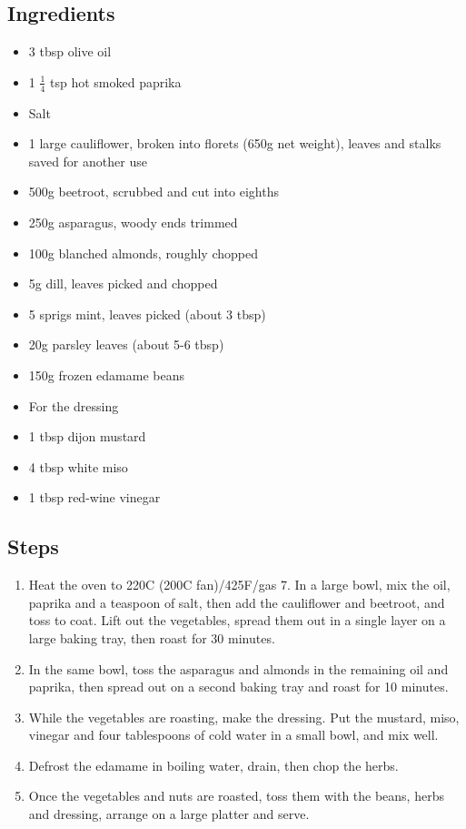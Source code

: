 \documentclass{book}
\begin{document}
\subsection*{Ingredients}
\begin{itemize}
\item 3 tbsp olive oil
\item 1 $\frac{1}{4}$ tsp hot smoked paprika
\item Salt
\item 1 large cauliflower, broken into florets (650g net weight), leaves and stalks saved for another use
\item 500g beetroot, scrubbed and cut into eighths
\item 250g asparagus, woody ends trimmed
\item 100g blanched almonds, roughly chopped
\item 5g dill, leaves picked and chopped
\item 5 sprigs mint, leaves picked (about 3 tbsp)
\item 20g parsley leaves (about 5-6 tbsp)
\item 150g frozen edamame beans
\end{itemize}

\begin{itemize}
\item For the dressing
\item 1 tbsp dijon mustard
\item 4 tbsp white miso
\item 1 tbsp red-wine vinegar
\end{itemize}

\subsection*{Steps}
\begin{enumerate}
\item Heat the oven to 220C (200C fan)/425F/gas 7. In a large bowl, mix the oil, paprika and a teaspoon of salt, then add the cauliflower and beetroot, and toss to coat. Lift out the vegetables, spread them out in a single layer on a large baking tray, then roast for 30 minutes.
\item In the same bowl, toss the asparagus and almonds in the remaining oil and paprika, then spread out on a second baking tray and roast for 10 minutes.
\item While the vegetables are roasting, make the dressing. Put the mustard, miso, vinegar and four tablespoons of cold water in a small bowl, and mix well.
\item Defrost the edamame in boiling water, drain, then chop the herbs. 
\item Once the vegetables and nuts are roasted, toss them with the beans, herbs and dressing, arrange on a large platter and serve.
\end{enumerate}
\newpage
\end{document}
